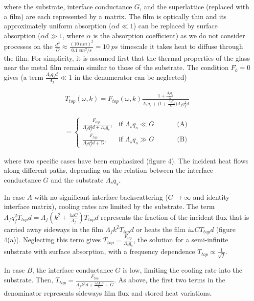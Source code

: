 \documentclass[5p]{elsarticle}
\begin{document}
\noindent where the substrate, interface conductance $G$, and the superlattice (replaced with a film) are each represented by a matrix. The film is optically thin and its approximately uniform absorption ($\alpha d \ll 1$) can be replaced by surface absorption ($\alpha d \gg 1$, where $\alpha$ is the absorption coefficient) as we do not consider processes on the $\frac{d^{2}}{D}\approx \frac{(10~nm)^{2}}{0.1~cm^{2}/s} = 10~ps$ timescale it takes heat to diffuse through the film. For simplicity, it is assumed first that the thermal properties of the glass near the metal film remain similar to those of the substrate. The condition $F_{b}=0$ gives (a term $ \frac{\Lambda_{s}q_{s}d}{\Lambda_{f}} \ll 1$ in the denumerator can be neglected)

\begin{eqnarray}
T_{top}(\omega,k)= F_{top}(\omega, k) \frac{1+\frac{\Lambda_{s}q_{s}}{G}}{\Lambda_{s}q_{s}+\Big (1+\frac{\Lambda_{s}q_{s}}{G} \Big) \Lambda_{f}q_{f}^{2}d}
\end{eqnarray}

\begin{eqnarray}
    =
\begin{cases}
    \frac{F_{top}}{\Lambda_{f}q_{f}^{2}d+\Lambda_{s}q_{s}} ,& \text{if }  \Lambda_{s}q_{s}\ll G  \text{~~~~~~~~~~(A)} \\
    \frac{F_{top}}{\Lambda_{f}q_{f}^{2}d + G },  & \text{if }  \Lambda_{s}q_{s}\gg G  \text{~~~~~~~~~~(B)}
\end{cases}
\end{eqnarray}

\noindent where two specific cases have been emphasized (figure 4). The incident heat flows along different paths, depending on the relation between the interface conductance $G$ and the substrate $\Lambda_{s}q_{s}$.

In case $A$ with no significant interface backscattering ($G\rightarrow \infty$ and identity interface matrix), cooling rates are limited by the substrate. The term $\Lambda_{f}q_{f}^{2} T_{top} d =\Lambda_{f}(k^{2}+\frac{i\omega C}{\Lambda_{f}}) T_{top} d $ represents the fraction of the incident flux that is carried away sideways in the film $\Lambda_{f} k^{2} T_{top} d$ or heats the film $i\omega C T_{top} d$ (figure 4(a)). Neglecting this term gives $T_{top}=\frac{F_{top}}{\Lambda_{s}q_{s}}$, the solution for a semi-infinite substrate with surface absorption, with a frequency dependence $T_{top}\propto \frac{1}{\sqrt{f}}$.

In case $B$, the interface conductance $G$ is low, limiting the cooling rate into the substrate. Then, $T_{top}=\frac{F_{top}}{\Lambda_{f} k^{2} d +\frac{i\omega \Lambda_{f}d}{D}+G}$. As above, the first two terms in the denominator represents sideways film flux and stored heat variations.
\end{document}
